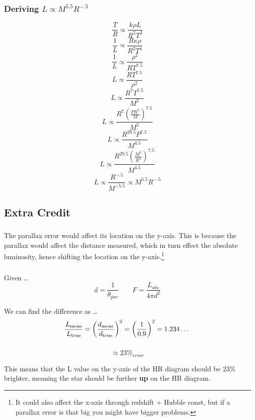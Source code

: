 \documentclass{article}
\begin{document}

\subsubsection{Deriving \(L \propto M^{5.5} R^{-.5} \)}
\[\frac{T}{R} \propto \frac{k\rho L}{R^2 T^3}\]
\[\frac{1}{L} \propto \frac{R\kappa \rho }{R^2T^4}\]
\[\frac{1}{L} \propto \frac{\rho^2}{RT^{7.5}}\]
\[L \propto \frac{RT^{7.5}}{\rho^2}\]
\[L \propto \frac{R^7T^{7.5}}{M^2}\]
\[L \propto \frac{R^7\left(\frac{P R^3}{M}\right)^{7.5}}{M^2}\]
\[L \propto \frac{R^{29.5}P^{7.5}}{M^{4.5}}\]
\[L \propto \frac{R^{29.5}\left(\frac{M^2}{R^4}\right)^{7.5}}{M^{4.5}}\]
\[L \propto \frac{R^{-.5}}{M^{-5.5}} \propto M^{5.5} R^{-.5}\]


\subsection{Extra Credit}
\subsubsection{}
The parallax error would affect its location on the y-axis. This is because the parallax would affect the distance measured, which in turn effect the absolute luminosity, hence shifting the location on the y-axis.\footnote{It could also affect the x-axis through redshift + Hubble const, but if a parallax error is that big you might have bigger problems.}

\subsubsection{}
Given \dots
\[d = \frac{1}{\theta_{par}} \qquad F = \frac{L_{abs}}{4\pi d^2} \]

We can find the difference as \dots
\[
\frac{L_{\rm meas}}{L_{\rm true}}
= \left(\frac{d_{\rm meas}}{d_{\rm true}}\right)^2
= \left(\frac{1}{0.9}\right)^2
= 1.234\dots
\]

\subsubsection{}
\[\approx 23\%_{error}\]

\begin{center}
    This means that the L value on the y-axis of the HR diagram should be \(23\%\) brighter, meaning the star should be further \textbf{up} on the HR diagram.
\end{center}
\end{document}
